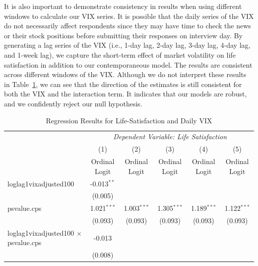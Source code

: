 \documentclass[11pt,a4paper,oldfontcommands]{memoir}
\begin{document}
{It is also important to demonstrate consistency in results when using different windows to calculate our VIX series. It is possible that the daily series of the VIX do not necessarily affect respondents since they may have time to check the news or their stock positions before submitting their responses on interview day. By generating a lag series of the VIX (i.e., 1-day lag, 2-day lag, 3-day lag, 4-day lag, and 1-week lag), we capture the short-term effect of market volatility on life satisfaction in addition to our contemporaneous model. The results are consistent across different windows of the VIX. Although we do not interpret these results in Table~\ref{tab:mdl2rslt}, we can see that the direction of the estimates is still consistent for both the VIX and the interaction term. It indicates that our models are robust, and we confidently reject our null hypothesis.

\begin{footnotesize}
\def\sym#1{\ifmmode^{#1}\else\(^{#1}\)\fi}
\begin{longtable}{l*{5}{c}}

\caption{Regression Results for Life-Satisfaction and Daily VIX \label{tab:mdl2rslt}} 

& \multicolumn{5}{c}{\textit{Dependent Variable: Life Satisfaction}} \\ 
\cline{2-6} 
                    &\multicolumn{1}{c}{(1)}&\multicolumn{1}{c}{(2)}&\multicolumn{1}{c}{(3)}&\multicolumn{1}{c}{(4)}&\multicolumn{1}{c}{(5)}\\
                    &\multicolumn{1}{c}{Ordinal Logit}&\multicolumn{1}{c}{Ordinal Logit}&\multicolumn{1}{c}{Ordinal Logit}&\multicolumn{1}{c}{Ordinal Logit}&\multicolumn{1}{c}{Ordinal Logit}\\
\hline
loglag1vixadjusted100&      -0.013$^{**}$ &                     &                     &                     &                     \\
                    &     (0.005)         &                     &                     &                     &                     \\
 
psvalue.cps         &       1.021$^{***}$&       1.003$^{***}$&       1.305$^{***}$&       1.189$^{***}$&       1.122$^{***}$\\
                    &     (0.093)         &     (0.093)         &     (0.093)         &     (0.093)         &     (0.093)         \\
 
loglag1vixadjusted100 $\times$ psvalue.cps&      -0.013         &                     &                     &                     &                     \\
                    &     (0.008)         &                     &                     &                     &                     \\
 

\end{longtable}
\end{footnotesize}}
\end{document}
